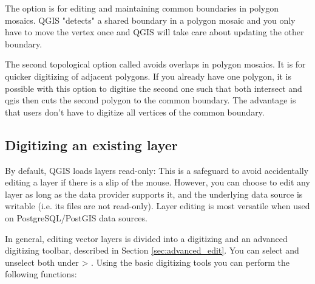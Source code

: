 
The option  is for editing and maintaining 
common boundaries in polygon mosaics. QGIS "detects" a shared boundary in 
a polygon mosaic and you only have to move the vertex once and QGIS will take 
care about updating the other boundary.


The second topological option called  
avoids overlaps in polygon mosaics. It is for quicker digitizing of adjacent polygons. 
If you already have one polygon, it is possible with this option to digitise the second 
one such that both intersect and qgis then cuts the second polygon to the common boundary. 
The advantage is that users don't have to digitize all vertices of the common boundary.

\subsection{Digitizing an existing layer}
\label{sec:edit_existing_layer}

By default, QGIS loads layers read-only: This is a safeguard
to avoid accidentally editing a layer if there is a slip of the mouse.
However, you can choose to edit any layer as long as the data provider
supports it, and the underlying data source is writable (i.e. its files are
not read-only). Layer editing is most versatile when used on
PostgreSQL/PostGIS data sources.

In general, editing vector layers is divided into a digitizing and an advanced
digitizing toolbar, described in Section \ref{sec:advanced_edit}. You can
select and unselect both under  > .
Using the basic digitizing tools you can perform the following functions:

